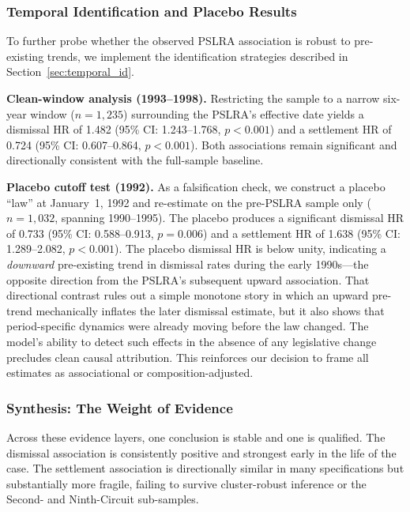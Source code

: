 \subsubsection*{Temporal Identification and Placebo Results}

To further probe whether the observed PSLRA association
is robust to pre-existing trends, we
implement the identification strategies described in
Section~\ref{sec:temporal_id}.

\textbf{Clean-window analysis (1993--1998).} Restricting the
sample to a narrow six-year window ($n = 1{,}235$)
surrounding the PSLRA's effective date yields a dismissal
HR of 1.482 (95\% CI: 1.243--1.768, $p < 0.001$) and a
settlement HR of 0.724 (95\% CI: 0.607--0.864, $p < 0.001$).
Both associations remain significant and directionally
consistent with the full-sample baseline.

\textbf{Placebo cutoff test (1992).} As a falsification
check, we construct a placebo ``law'' at January~1, 1992 and
re-estimate on the pre-PSLRA sample only ($n = 1{,}032$,
spanning 1990--1995). The placebo produces a significant
dismissal HR of 0.733 (95\% CI: 0.588--0.913, $p = 0.006$)
and a settlement HR of 1.638 (95\% CI: 1.289--2.082,
$p < 0.001$). The placebo dismissal HR is below unity,
indicating a \emph{downward} pre-existing trend in dismissal
rates during the early 1990s---the opposite direction from
the PSLRA's subsequent upward association. That directional
contrast rules out a simple monotone story in which an
upward pre-trend mechanically inflates the later dismissal
estimate, but it also shows that period-specific dynamics
were already moving before the law changed. The model's
ability to detect such effects in the absence of any
legislative change precludes clean causal attribution. This
reinforces our decision to frame all estimates as
associational or composition-adjusted.

\subsubsection*{Synthesis: The Weight of Evidence}

Across these evidence layers, one conclusion is stable and
one is qualified. The dismissal association is consistently
positive and strongest early in the life of the case. The
settlement association is directionally similar in many
specifications but substantially more fragile, failing to
survive cluster-robust inference or the Second- and
Ninth-Circuit sub-samples.

